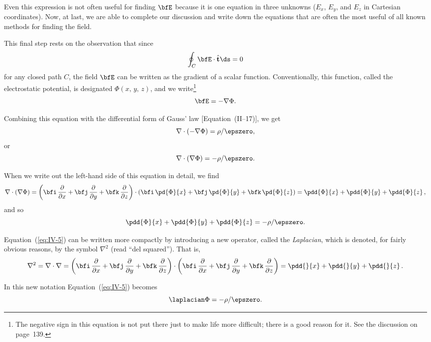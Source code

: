 Even this expression is not often useful for finding $\bfE$ because
it is one equation in three unknowns ($E_x$, $E_y$, and $E_z$ in
Cartesian coordinates).  Now, at last, we are able to complete our
discussion and write down the equations that are often the most
useful of all known methods for finding the field.

This final step rests on the observation that since
\[
\oint_C \bfE \cdot \hat{\mathbf{t}}\ds = 0
\]
for any closed path $C$, the field $\bfE$ can be written as the
gradient of a scalar function.  Conventionally, this function, called
the electrostatic potential, is designated $\Phi(x,\,y,\,z)$, and we
write\footnote{The negative sign in this equation is not put there just
to make life more difficult; there is a good reason for it.  See the
discussion on page~139.}
\[
\bfE = -\nabla\Phi.
\]

Combining this equation with the differential form of Gauss' law
[Equation~(II--17)], we get
\[
\nabla\cdot(-\nabla\Phi) = \rho/\epszero,
\]
or
\[
\nabla\cdot(\nabla\Phi) = -\rho/\epszero.
\]

When we write out the left-hand side of this equation in detail, we
find
\[
\nabla\cdot(\nabla\Phi)
= \left(\bfi\,\frac{\partial}{\partial x}
  + \bfj\,\frac{\partial}{\partial y}
  + \bfk\,\frac{\partial}{\partial z}\right)
  \cdot\left(\bfi\,\pd{\Phi}{x}
  + \bfj\,\pd{\Phi}{y}
  + \bfk\,\pd{\Phi}{z}\right)
= \pdd{\Phi}{x} + \pdd{\Phi}{y} + \pdd{\Phi}{z}\,,
\]
and so
\begin{equation}
\pdd{\Phi}{x} + \pdd{\Phi}{y} + \pdd{\Phi}{z}
= -\rho/\epszero.
\label{eq:IV-5}
\end{equation}

Equation~(\ref{eq:IV-5}) can be written more compactly by
introducing a new operator, called the \emph{Laplacian}, which is
denoted, for fairly obvious reasons, by the symbol $\nabla^2$ (read
``del squared'').  That is,
\begin{equation}
\nabla^2 = \nabla\cdot\nabla
= \left(\bfi\,\frac{\partial}{\partial x}
  + \bfj\,\frac{\partial}{\partial y}
  + \bfk\,\frac{\partial}{\partial z}\right)
  \cdot\left(\bfi\,\frac{\partial}{\partial x}
  + \bfj\,\frac{\partial}{\partial y}
  + \bfk\,\frac{\partial}{\partial z}\right)
= \pdd{}{x} + \pdd{}{y} + \pdd{}{z}\,.
\label{eq:IV-6}
\end{equation}

In this new notation Equation~(\ref{eq:IV-5}) becomes
\begin{equation}
\laplacian\Phi = -\rho/\epszero.
\label{eq:IV-7}
\end{equation}

